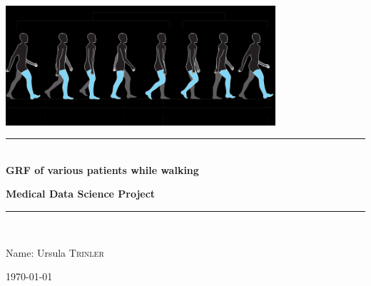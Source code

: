 \begin{titlepage} %
	\newcommand{\HRule}{\rule{\linewidth}{0.5mm}} %
	
	\center %
	
	
	\includegraphics[width=0.75\textwidth]{Introwalking.png}

	
	\vspace{1.5cm}
	
	\HRule\\[0.6cm]
	
	{\huge\bfseries GRF of various patients while walking} \\
	
	\vspace{1.0cm}
	
	{\large\bfseries Medical Data Science Project}\\[0.4cm] %
	
	\HRule\\[1.5cm]
	

	\huge

	Name: Ursula \textsc{Trinler}

	
	\vfill\vfill %
	
	{\large\today} %
	
	\vfill %
	
\end{titlepage}


%
